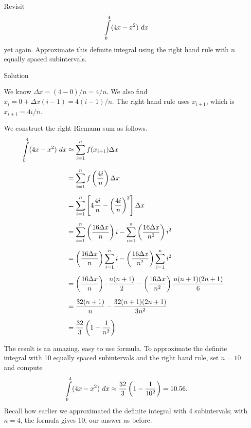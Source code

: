 \ifanalysis
\begin{example}\label{ex_rie9}

Revisit $$\ds\int\limits_0^4(4x-x^2)\ dx$$ yet again. Approximate this definite integral using the right hand rule with $n$ equally spaced subintervals.

Solution 

We know $\Delta x = (4-0)/n = 4/n$. We also find $x_i = 0 + \Delta x(i-1) = 4(i-1)/n$. The right hand rule uses $x_{i+1}$, which is $x_{i+1} = 4i/n$.

We construct the right Riemann sum as follows.
\allowdisplaybreaks
\begin{align*}
		\displaystyle\int\limits_0^4(4x-x^2)\ dx &\approx \sum_{i=1}^n f(x_{i+1})\Delta x \\[0.2cm]
											&= \sum_{i=1}^n f\left(\frac{4i}{n}\right) \Delta x \\[0.2cm]
											&=	\sum_{i=1}^n \left[4\frac{4i}n-\left(\frac{4i}n\right)^2\right]\Delta x\\[0.2cm]
											&=	\sum_{i=1}^n \left(\frac{16\Delta x}{n}\right)i - \sum_{i=1}^n \left(\frac{16\Delta x}{n^2}\right)i^2 \\[0.2cm]
											&=	\left(\frac{16\Delta x}{n}\right)\sum_{i=1}^n i - \left(\frac{16\Delta x}{n^2}\right)\sum_{i=1}^n i^2  \\[0.2cm]
											&= \left(\frac{16\Delta x}{n}\right)\cdot \frac{n(n+1)}{2} - \left(\frac{16\Delta x}{n^2}\right)\frac{n(n+1)(2n+1)}{6} \quad \\[0.2cm]
											&=\frac{32(n+1)}{n} - \frac{32(n+1)(2n+1)}{3n^2} \quad  \\[0.2cm]
											&= \frac{32}{3}\left(1-\frac{1}{n^2}\right)
\end{align*}

The result is an amazing, easy to use formula. To approximate the definite integral with 10 equally spaced subintervals and the right hand rule, set $n=10$ and compute $$\displaystyle\int\limits_0^4 (4x-x^2)\ dx \approx \frac{32}{3}\left(1-\frac{1}{10^2}\right) = 10.56.$$
Recall how earlier we approximated the definite integral with 4 subintervals; with $n=4$, the formula gives 10, our answer as before.


\end{example}
